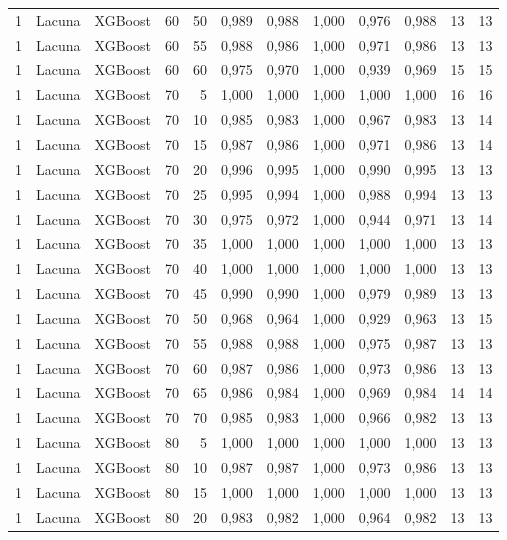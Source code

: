 \begin{longtable}{@{}rllrrrrrrrrr@{}}
1 & Lacuna & XGBoost & 60 & 50 & 0,989 & 0,988 & 1,000 & 0,976 & 0,988 & 13 & 13 \\
1 & Lacuna & XGBoost & 60 & 55 & 0,988 & 0,986 & 1,000 & 0,971 & 0,986 & 13 & 13 \\
1 & Lacuna & XGBoost & 60 & 60 & 0,975 & 0,970 & 1,000 & 0,939 & 0,969 & 15 & 15 \\
1 & Lacuna & XGBoost & 70 & 5 & 1,000 & 1,000 & 1,000 & 1,000 & 1,000 & 16 & 16 \\
1 & Lacuna & XGBoost & 70 & 10 & 0,985 & 0,983 & 1,000 & 0,967 & 0,983 & 13 & 14 \\
1 & Lacuna & XGBoost & 70 & 15 & 0,987 & 0,986 & 1,000 & 0,971 & 0,986 & 13 & 14 \\
1 & Lacuna & XGBoost & 70 & 20 & 0,996 & 0,995 & 1,000 & 0,990 & 0,995 & 13 & 13 \\
1 & Lacuna & XGBoost & 70 & 25 & 0,995 & 0,994 & 1,000 & 0,988 & 0,994 & 13 & 13 \\
1 & Lacuna & XGBoost & 70 & 30 & 0,975 & 0,972 & 1,000 & 0,944 & 0,971 & 13 & 14 \\
1 & Lacuna & XGBoost & 70 & 35 & 1,000 & 1,000 & 1,000 & 1,000 & 1,000 & 13 & 13 \\
1 & Lacuna & XGBoost & 70 & 40 & 1,000 & 1,000 & 1,000 & 1,000 & 1,000 & 13 & 13 \\
1 & Lacuna & XGBoost & 70 & 45 & 0,990 & 0,990 & 1,000 & 0,979 & 0,989 & 13 & 13 \\
1 & Lacuna & XGBoost & 70 & 50 & 0,968 & 0,964 & 1,000 & 0,929 & 0,963 & 13 & 15 \\
1 & Lacuna & XGBoost & 70 & 55 & 0,988 & 0,988 & 1,000 & 0,975 & 0,987 & 13 & 13 \\
1 & Lacuna & XGBoost & 70 & 60 & 0,987 & 0,986 & 1,000 & 0,973 & 0,986 & 13 & 13 \\
1 & Lacuna & XGBoost & 70 & 65 & 0,986 & 0,984 & 1,000 & 0,969 & 0,984 & 14 & 14 \\
1 & Lacuna & XGBoost & 70 & 70 & 0,985 & 0,983 & 1,000 & 0,966 & 0,982 & 13 & 13 \\
1 & Lacuna & XGBoost & 80 & 5 & 1,000 & 1,000 & 1,000 & 1,000 & 1,000 & 13 & 13 \\
1 & Lacuna & XGBoost & 80 & 10 & 0,987 & 0,987 & 1,000 & 0,973 & 0,986 & 13 & 13 \\
1 & Lacuna & XGBoost & 80 & 15 & 1,000 & 1,000 & 1,000 & 1,000 & 1,000 & 13 & 13 \\
1 & Lacuna & XGBoost & 80 & 20 & 0,983 & 0,982 & 1,000 & 0,964 & 0,982 & 13 & 13 \\

\end{longtable}
